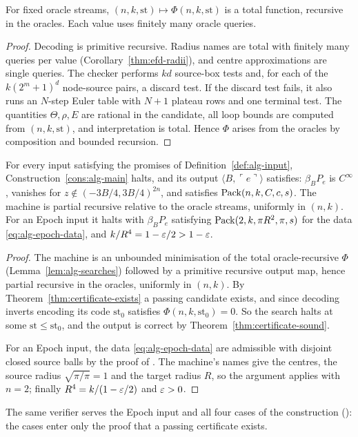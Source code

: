 \begin{lemma}\label{lem:alg-searches}
For fixed oracle streams, $(n,k,\mathrm{st})\mapsto\Phi(n,k,\mathrm{st})$ is a total function, recursive in the
oracles. Each value uses finitely many oracle queries.
\end{lemma}

\begin{proof}
Decoding is primitive recursive. Radius names are total with finitely many queries per value (Corollary~\ref{thm:efd-radii}), and centre approximations are single queries. The checker performs $kd$ source-box tests and, for each of the $k(2^m+1)^d$ node-source pairs, a discard test. If the discard test fails, it also runs an $N$-step Euler table with $N+1$ plateau rows and one terminal test. The quantities $\Theta,\rho,E$ are rational in the candidate, all loop bounds are computed from $(n,k,\mathrm{st})$, and interpretation is total. Hence $\Phi$ arises from the oracles by composition and bounded recursion.
\end{proof}

\begin{theorem}\label{thm:alg-main}
For every input satisfying the promises of Definition~\ref{def:alg-input}, Construction~\ref{cons:alg-main} halts,
and its output $\langle B,\ulcorner e\urcorner\rangle$ satisfies: $\beta_BP_e$ is $C^\infty$, vanishes for
$z\notin(-3B/4,3B/4)^{2n}$, and satisfies $\mathrm{Pack}(n,k,C,c,s)$. The machine is partial recursive relative to the oracle
streams, uniformly in $(n,k)$. For an Epoch input it halts with $\beta_BP_e$ satisfying $\mathrm{Pack}(2,k,\pi R^2,\pi,s)$ for
the data \eqref{eq:alg-epoch-data}, and $k/R^4=1-\varepsilon/2>1-\varepsilon$.
\end{theorem}

\begin{proof}
The machine is an unbounded minimisation of the total oracle-recursive $\Phi$ (Lemma~\ref{lem:alg-searches}) followed by a primitive recursive output map, hence partial recursive in the oracles, uniformly in $(n,k)$. By Theorem~\ref{thm:certificate-exists} a passing candidate exists, and since decoding inverts encoding its code $\mathrm{st}_0$ satisfies $\Phi(n,k,\mathrm{st}_0)=0$. So the search halts at some $\mathrm{st}\le\mathrm{st}_0$, and the output is correct by Theorem~\ref{thm:certificate-sound}.

For an Epoch input, the data \eqref{eq:alg-epoch-data} are admissible with disjoint closed source balls by the proof of . The machine's names give the centres, the source radius $\sqrt{\pi/\pi}=1$ and the target radius $R$, so the argument applies with $n=2$; finally $R^4=k/(1-\varepsilon/2)$ and $\varepsilon>0$.
\end{proof}

\begin{remark}\label{rem:alg-epoch}
The same verifier serves the Epoch input and all four cases of the construction ():
the cases enter only the proof that a passing certificate exists.
\end{remark}
